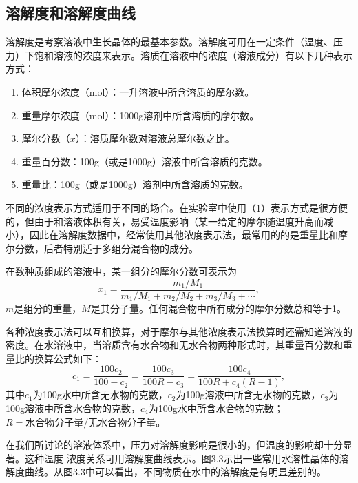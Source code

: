 ﻿\subsection{溶解度和溶解度曲线}
溶解度是考察溶液中生长晶体的最基本参数。溶解度可用在一定条件（温度、压力）下饱和溶液的浓度来表示。溶质在溶液中的浓度（溶液成分）有以下几种表示方式：
\begin{enumerate}[(1)]\itemsep -0.5ex
\item 体积摩尔浓度（mol）：一升溶液中所含溶质的摩尔数。
\item 重量摩尔浓度（mol）：1000g溶剂中所含溶质的摩尔数。
\item 摩尔分数（$x$）：溶质摩尔数对溶液总摩尔数之比。
\item 重量百分数：100g（或是1000g）溶液中所含溶质的克数。
\item 重量比：100g（或是1000g）溶剂中所含溶质的克数。
\end{enumerate}

不同的浓度表示方式适用于不同的场合。在实验室中使用（1）表示方式是很方便的，但由于和溶液体积有关，易受温度影响（某一给定的摩尔随温度升高而减小），因此在溶解度数据中，经常使用其他浓度表示法，最常用的的是重量比和摩尔分数，后者特别适于多组分混合物的成分。

在数种质组成的溶液中，某一组分的摩尔分数可表示为
\begin{equation}
x_1=\frac{m_1/M_1}{m_1/M_1+m_2/M_2+m_3/M_3+\cdots},
\end{equation}
$m$是组分的重量，$M$是其分子量。任何混合物中所有成分的摩尔分数总和等于1。

各种浓度表示法可以互相换算，对于摩尔与其他浓度表示法换算时还需知道溶液的密度。在水溶液中，当溶质含有水合物和无水合物两种形式时，其重量百分数和重量比的换算公式如下：
\begin{equation}
c_1=\frac{100c_2}{100-c_2}=\frac{100c_3}{100R-c_3}=\frac{100c_4}{100R+c_4(R-1)},
\end{equation}
其中$c_1$为100g水中所含无水物的克数，$c_2$为100g溶液中所含无水物的克数，$c_3$为100g溶液中所含水合物的克数，$c_4$为100g水中所含水合物的克数；$R=\text{水合物分子量}/\text{无水合物分子量}$。

在我们所讨论的溶液体系中，压力对溶解度影响是很小的，但温度的影响却十分显著。这种温度-浓度关系可用溶解度曲线表示。图3.3示出一些常用水溶性晶体的溶解度曲线。从图3.3中可以看出，不同物质在水中的溶解度是有明显差别的。

